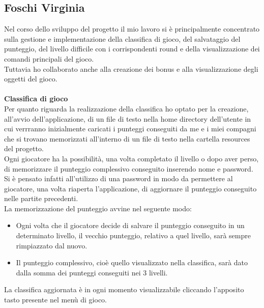 \documentclass[a4paper,12pt]{report}
\begin{document}
\subsection{Foschi Virginia}
Nel corso dello sviluppo del progetto il mio lavoro si è principalmente concentrato sulla gestione e implementazione della classifica di gioco, del salvataggio del punteggio, del livello difficile con i corrispondenti round e della visualizzazione dei comandi principali del gioco.\\
Tuttavia ho collaborato anche alla creazione dei bonus e alla visualizzazione degli oggetti del gioco.\\\\
\textbf{Classifica di gioco}\\
Per quanto riguarda la realizzazione della classifica ho optato per la creazione, all'avvio dell'applicazione, di un file di testo nella home directory dell'utente in cui verrranno inizialmente caricati i punteggi conseguiti da me e i miei compagni che si trovano memorizzati all'interno di un file di testo nella cartella resources del progetto.
\\Ogni giocatore ha la possibilità, una volta completato il livello o dopo aver perso, di memorizzare il punteggio complessivo conseguito inserendo nome e password. Si è pensato infatti all'utilizzo di una password in modo da permettere al giocatore, una volta riaperta l'applicazione, di aggiornare il punteggio conseguito nelle partite precedenti.
\\La memorizzazione del punteggio avvine nel seguente modo:
\begin{itemize}
    \item Ogni volta che il giocatore decide di salvare il punteggio conseguito in un determinato livello, il vecchio punteggio, relativo a quel livello, sarà sempre rimpiazzato dal nuovo.
    \item Il punteggio complessivo, cioè quello visualizzato nella classifica, sarà dato dalla somma dei punteggi conseguiti nei 3 livelli.
\end{itemize}
La classifica aggiornata è in ogni momento visualizzabile cliccando l'apposito tasto presente nel menù di gioco.\\\\
\end{document}
